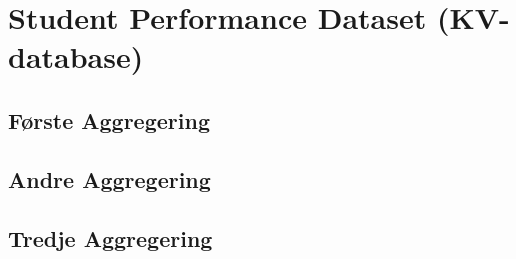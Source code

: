 \section{Student Performance Dataset (KV-database)}

\subsection{Første Aggregering}

\subsection{Andre Aggregering}

\subsection{Tredje Aggregering}

